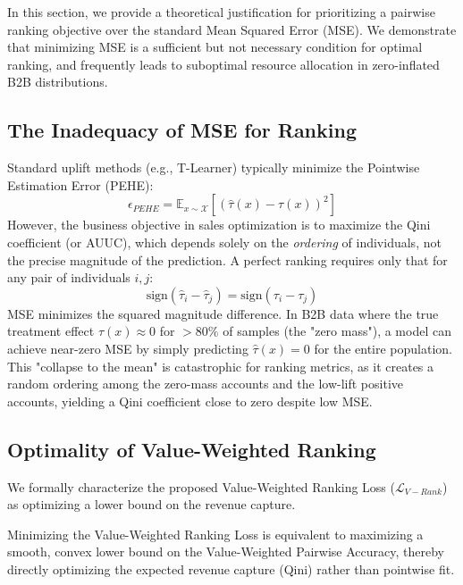 \documentclass[runningheads]{llncs}
\begin{document}
In this section, we provide a theoretical justification for prioritizing a pairwise ranking objective over the standard Mean Squared Error (MSE). We demonstrate that minimizing MSE is a sufficient but not necessary condition for optimal ranking, and frequently leads to suboptimal resource allocation in zero-inflated B2B distributions.

\subsection{The Inadequacy of MSE for Ranking}
Standard uplift methods (e.g., T-Learner) typically minimize the Pointwise Estimation Error (PEHE):
\begin{equation}
    \epsilon_{PEHE} = \mathbb{E}_{x \sim \mathcal{X}} [(\hat{\tau}(x) - \tau(x))^2]
\end{equation}
However, the business objective in sales optimization is to maximize the Qini coefficient (or AUUC), which depends solely on the \textit{ordering} of individuals, not the precise magnitude of the prediction. A perfect ranking requires only that for any pair of individuals $i, j$:
\begin{equation}
    \text{sign}(\hat{\tau}_i - \hat{\tau}_j) = \text{sign}(\tau_i - \tau_j)
\end{equation}
MSE minimizes the squared magnitude difference. In B2B data where the true treatment effect $\tau(x) \approx 0$ for $>80\%$ of samples (the "zero mass"), a model can achieve near-zero MSE by simply predicting $\hat{\tau}(x) = 0$ for the entire population. This "collapse to the mean" is catastrophic for ranking metrics, as it creates a random ordering among the zero-mass accounts and the low-lift positive accounts, yielding a Qini coefficient close to zero despite low MSE.

\subsection{Optimality of Value-Weighted Ranking}
We formally characterize the proposed Value-Weighted Ranking Loss ($\mathcal{L}_{V-Rank}$) as optimizing a lower bound on the revenue capture.

\begin{proposition}
Minimizing the Value-Weighted Ranking Loss is equivalent to maximizing a smooth, convex lower bound on the Value-Weighted Pairwise Accuracy, thereby directly optimizing the expected revenue capture (Qini) rather than pointwise fit.
\end{proposition}
\end{document}
